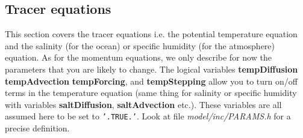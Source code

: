 \subsection{Tracer equations}

This section covers the tracer equations i.e. the potential
temperature equation and the salinity (for the ocean) or specific
humidity (for the atmosphere) equation. As for the momentum equations,
we only describe for now the parameters that you are likely to change.
The logical variables \textbf{tempDiffusion} \textbf{tempAdvection}
\textbf{tempForcing}, and \textbf{tempStepping} allow you to turn
on/off terms in the temperature equation (same thing for salinity or
specific humidity with variables \textbf{saltDiffusion},
\textbf{saltAdvection} etc.). These variables are all assumed here to
be set to \texttt{'.TRUE.'}. Look at file \textit{model/inc/PARAMS.h}
for a precise definition.

